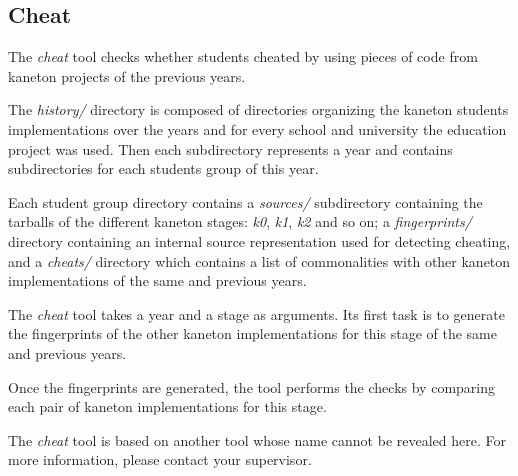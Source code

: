 %
%
%
%
%
%

%
%

\subsection{Cheat}
\label{section:cheat}

The \textit{cheat} tool checks whether students cheated by using pieces of
code from kaneton projects of the previous years.

The \textit{history/} directory is composed of directories organizing the
kaneton students implementations over the years and for every school and
university the education project was used. Then each subdirectory represents
a year and contains subdirectories for each students group of this year.

Each student group directory contains a \textit{sources/} subdirectory
containing the tarballs of the different kaneton stages: \textit{k0},
\textit{k1}, \textit{k2} and so on; a \textit{fingerprints/} directory
containing an internal source representation used for detecting cheating,
and a \textit{cheats/} directory which contains a list of commonalities
with other kaneton implementations of the same and previous years.

The \textit{cheat} tool takes a year and a stage as arguments. Its first
task is to generate the fingerprints of the other kaneton implementations
for this stage of the same and previous years.

Once the fingerprints are generated, the tool performs the checks by
comparing each pair of kaneton implementations for this stage.

The \textit{cheat} tool is based on another tool whose name cannot be revealed
here. For more information, please contact your supervisor.
